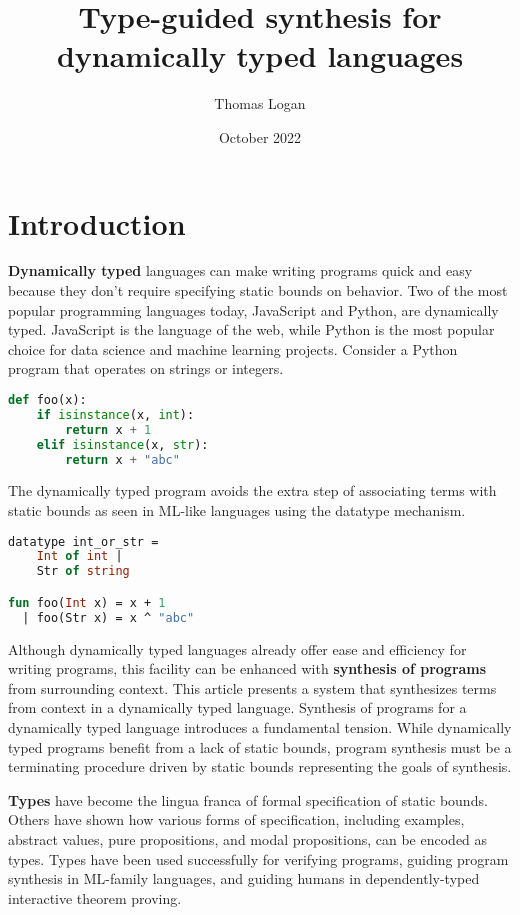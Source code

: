 \documentclass[sigplan,screen]{acmart}
\title{Type-guided synthesis for dynamically typed languages}
\author{Thomas Logan}
\date{October 2022}
\begin{document}
\maketitle

\section{Introduction}

\textbf{Dynamically typed} languages can make writing programs quick and easy 
because they don't require specifying static bounds on behavior.
Two of the most popular programming languages today, JavaScript and Python, 
are dynamically typed. 
JavaScript is the language of the web, while Python is the most popular choice
for data science and machine learning projects. 
Consider a Python program that operates on strings or integers. 

\begin{lstlisting}[language=Python]
def foo(x):
    if isinstance(x, int):
        return x + 1 
    elif isinstance(x, str): 
        return x + "abc"
\end{lstlisting}

\noindent The dynamically typed program avoids the extra step of associating terms with
static bounds as seen in ML-like languages using the datatype mechanism. 

\begin{lstlisting}[language=ML]
datatype int_or_str = 
    Int of int | 
    Str of string

fun foo(Int x) = x + 1
  | foo(Str x) = x ^ "abc"
\end{lstlisting}


Although dynamically typed languages already offer ease and efficiency for writing programs, 
this facility can be enhanced with \textbf{synthesis of programs} 
from surrounding context. 
This article presents a system that synthesizes terms from context 
in a dynamically typed language.
Synthesis of programs for a dynamically typed language introduces a fundamental tension. 
While dynamically typed programs benefit from a lack of static bounds, program synthesis
must be a terminating procedure driven by static bounds representing the goals of synthesis.   

\textbf{Types} have become the lingua franca of formal specification of static bounds.
Others have shown how various forms of specification, including examples, abstract values, 
pure propositions, and modal propositions, can be encoded as types.
Types have been used successfully for verifying programs, 
guiding program synthesis in ML-family languages, 
and guiding humans in dependently-typed interactive theorem proving. 
\end{document}
